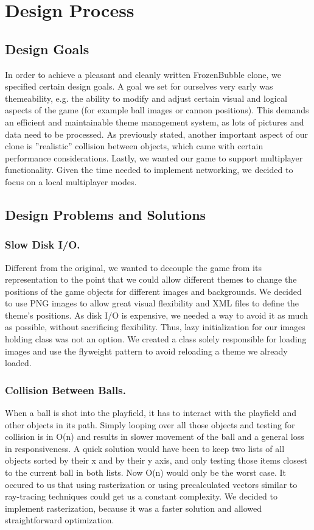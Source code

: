 \section{Design Process}
\subsection{Design Goals}
In order to achieve a pleasant and cleanly written FrozenBubble clone, we specified certain design goals.
A goal we set for ourselves very early was themeability, e.g. the ability to modify and 
adjust certain visual and logical aspects of the game (for example ball images or 
cannon positions). This demands an efficient and maintainable theme management 
system, as lots of pictures and data need to be processed.
As previously stated, another important aspect of our clone is ''realistic'' 
collision between objects, which came with certain performance considerations.
Lastly, we wanted our game to support multiplayer functionality. Given the time 
needed to implement networking, we decided to focus on a local multiplayer modes. 

\subsection{Design Problems and Solutions}
\subsubsection{Slow Disk I/O.}
\label{sec:theme}
%
Different from the original, we wanted to decouple the game from its representation 
to the point that we could allow different themes to change the positions of the 
game objects for different images and backgrounds. We decided to use PNG images to allow 
great visual flexibility and XML files to define the theme's positions. As disk I/O
is expensive, we needed a way to avoid it as much as possible, without sacrificing 
flexibility. Thus, lazy initialization for our images holding class was not an option. 
We created a class solely responsible for loading images and use the flyweight 
pattern to avoid reloading a theme we already loaded.
%
\subsubsection{Collision Between Balls.}
\label{sec:collision}
When a ball is shot into the playfield, it has to interact with the playfield 
and other objects in its path. Simply looping over all those objects and 
testing for collision is in O(n) and results in slower 
movement of the ball and a general loss in responsiveness. A quick solution 
would have been to keep two lists of all objects sorted by their x and by their 
y axis, and only testing those items closest to the current ball in both lists.
Now O(n) would only be the worst case. 
It occured to us that using rasterization or using precalculated vectors similar 
to ray-tracing techniques could get us a constant complexity. We decided 
to implement rasterization, because it was a faster solution and allowed straightforward
 optimization.
%
